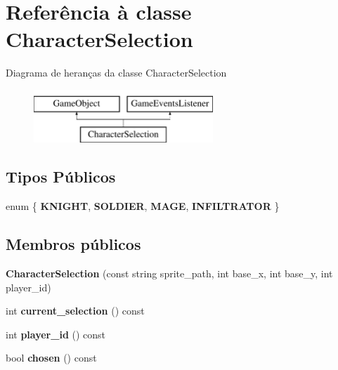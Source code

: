 \hypertarget{classCharacterSelection}{}\section{Referência à classe Character\+Selection}
\label{classCharacterSelection}
Diagrama de heranças da classe Character\+Selection\begin{figure}[H]
\begin{center}
\leavevmode
\includegraphics[height=2.000000cm]{classCharacterSelection}
\end{center}
\end{figure}
\subsection*{Tipos Públicos}
\begin{DoxyCompactItemize}
\item 
\mbox{\label{classCharacterSelection_a14b33a13e3498992faa7261e6f5e55ca}} 
enum \{ {\bfseries K\+N\+I\+G\+HT}, 
{\bfseries S\+O\+L\+D\+I\+ER}, 
{\bfseries M\+A\+GE}, 
{\bfseries I\+N\+F\+I\+L\+T\+R\+A\+T\+OR}
 \}
\end{DoxyCompactItemize}
\subsection*{Membros públicos}
\begin{DoxyCompactItemize}
\item 
\mbox{\label{classCharacterSelection_ac3cb2219a5eda202ecc9a17218326073}} 
{\bfseries Character\+Selection} (const string sprite\+\_\+path, int base\+\_\+x, int base\+\_\+y, int player\+\_\+id)
\item 
\mbox{\label{classCharacterSelection_a900358acbdbd8ee33da089014f3ab8bb}} 
int {\bfseries current\+\_\+selection} () const
\item 
\mbox{\label{classCharacterSelection_add606b028ba88000e1920d4f10992934}} 
int {\bfseries player\+\_\+id} () const
\item 
\mbox{\label{classCharacterSelection_ab6f27f44a433da27c786b25b9c4945ca}} 
bool {\bfseries chosen} () const
\end{DoxyCompactItemize}
